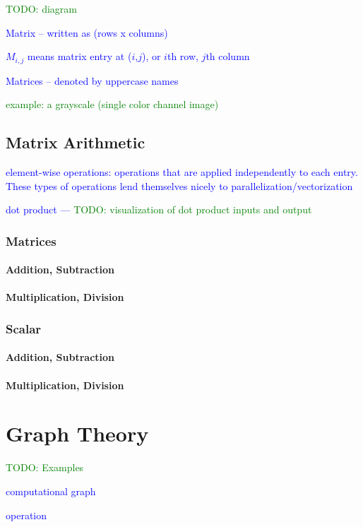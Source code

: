 \textcolor{green}{TODO: diagram}

\textcolor{blue}{Matrix -- written as (rows x columns)}

\textcolor{blue}{$M_{i,j}$ means matrix entry at ($i$,$j$), or $i$th row, $j$th column}


\textcolor{blue}{Matrices -- denoted by uppercase names}

\textcolor{green}{example: a grayscale (single color channel image)}



\subsection{Matrix Arithmetic}

\textcolor{blue}{{element-wise} operations: operations that are applied independently to each entry. These types of operations lend themselves nicely to parallelization/vectorization}

\textcolor{blue}{dot product --- \textcolor{green}{TODO: visualization of dot product inputs and output}}

\subsubsection{Matrices}

\paragraph{Addition, Subtraction}

\paragraph{Multiplication, Division}

\subsubsection{Scalar}

\paragraph{Addition, Subtraction}

\paragraph{Multiplication, Division}



\section{Graph Theory}

\textcolor{green}{TODO: Examples}

\textcolor{blue}{computational graph}

\textcolor{blue}{operation}

